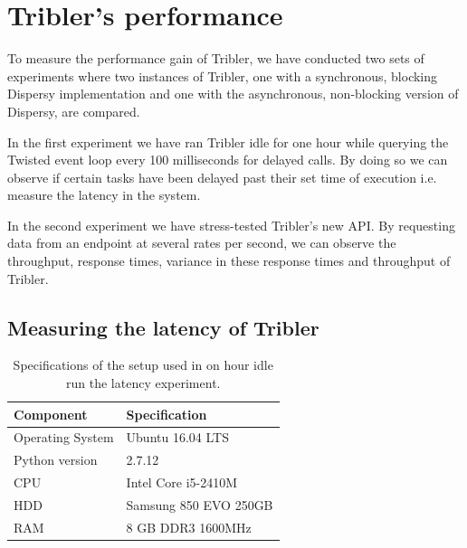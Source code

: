 \section{Tribler's performance}

To measure the performance gain of Tribler, we have conducted two sets of experiments where two instances of Tribler, one with a synchronous, blocking Dispersy implementation and one with the asynchronous, non-blocking version of Dispersy, are compared.

In the first experiment we have ran Tribler idle for one hour while querying the Twisted event loop every 100 milliseconds for delayed calls.
By doing so we can observe if certain tasks have been delayed past their set time of execution i.e. measure the latency in the system.

In the second experiment we have stress-tested Tribler's new API.
By requesting data from an endpoint at several rates per second, we can observe the throughput, response times, variance in these response times and throughput of Tribler.

\subsection{Measuring the latency of Tribler}

\begin{table}[h]
	\centering
	\caption{Specifications of the setup used in on hour idle run the latency experiment.}
	\label{table:specs_hp_elitebook}
	\begin{tabular}{l|l}
		\hline
		\textbf{Component}	& \textbf{Specification} \\ \hline
		Operating System   	& Ubuntu 16.04 LTS \\
		Python version		& 2.7.12 \\
		CPU					& Intel Core i5-2410M \\ 
		HDD					& Samsung 850 EVO 250GB  \\ 
		RAM					& 8 GB DDR3 1600MHz \\
	\end{tabular}
\end{table}

